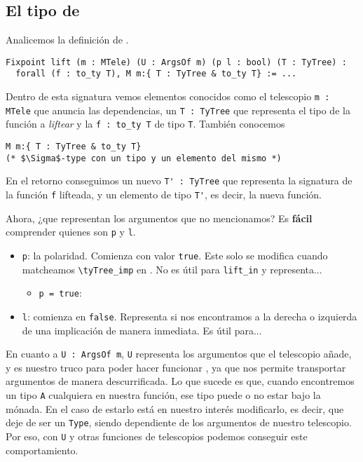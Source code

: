 \subsection{El tipo de \lift}

Analicemos la definición de \lift.

\begin{lstlisting}
Fixpoint lift (m : MTele) (U : ArgsOf m) (p l : bool) (T : TyTree) :
  forall (f : to_ty T), M m:{ T : TyTree & to_ty T} := ...
\end{lstlisting}

Dentro de esta signatura vemos elementos conocidos como el telescopio \lstinline{m : MTele} que anuncia las dependencias, un \lstinline{T : TyTree} que representa el tipo de la función a \textit{liftear} y la \lstinline{f : to_ty T} de tipo \lstinline{T}.
También conocemos
\begin{lstlisting}
M m:{ T : TyTree & to_ty T}
(* $\Sigma$-type con un tipo y un elemento del mismo *)
\end{lstlisting}

En el retorno conseguimos un nuevo \lstinline{T' : TyTree} que representa la signatura de la función \lstinline{f} lifteada, y un elemento de tipo \lstinline{T'}, es decir, la nueva función.

Ahora, ¿que representan los argumentos que no mencionamos? Es \textbf{fácil} comprender quienes son \lstinline{p} y \lstinline{l}.
\begin{itemize}
    \item \lstinline{p}: la polaridad. Comienza con valor \lstinline{true}. Este solo se modifica cuando matcheamos \lstinline{\tyTree_imp} en \lift. No es útil para \lstinline{lift_in} y representa...
    \begin{itemize}
        \item \lstinline{p = true}:
    \end{itemize}
    \item \lstinline{l}: comienza en \lstinline{false}. Representa si nos encontramos a la derecha o izquierda de una implicación de manera inmediata. Es útil para...
\end{itemize}

En cuanto a \lstinline{U : ArgsOf m}, \lstinline{U} representa los argumentos que el telescopio añade, y es nuestro truco para poder hacer funcionar \lift, ya que nos permite transportar argumentos de manera descurrificada.
Lo que sucede es que, cuando encontremos un tipo \lstinline{A} cualquiera en nuestra función, ese tipo puede o no estar bajo la mónada.
En el caso de estarlo está en nuestro interés modificarlo, es decir, que deje de ser un \lstinline{Type}, siendo dependiente de los argumentos de nuestro telescopio.
Por eso, con \lstinline{U} y otras funciones de telescopios podemos conseguir este comportamiento.

